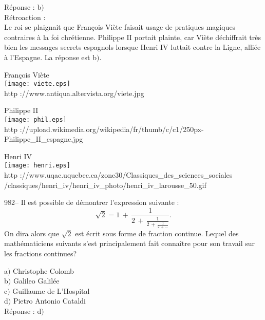 ﻿\documentclass[letterpaper, 12pt]{article}
\begin{document}
R\'eponse : b$)$\\

R\'etroaction : \\
Le roi se plaignait que Fran\c cois Vi\`ete faisait usage de
pratiques magiques contraires \`a la foi chr\'etienne. Philippe II
portait plainte, car Vi\`ete d\'echiffrait tr\`es bien les messages
secrets espagnols lorsque Henri IV luttait contre la Ligne, alli\'ee
\`a l'Espagne.
La r\'eponse est b$)$.\\

        \begin{center}
        Fran\c cois Vi\`ete\\
    \texttt{[image: viete.eps]}\\
        {\footnotesize http ://www.antiqua.altervista.org/viete.jpg}
    \end{center}

        \begin{center}
        Philippe II\\
    \texttt{[image: phil.eps]}\\
        {\footnotesize http
://upload.wikimedia.org/wikipedia/fr/thumb/c/c1/250px-Philippe\_II\_espagne.jpg}
    \end{center}

        \begin{center}
        Henri IV\\
    \texttt{[image: henri.eps]}\\
        {\footnotesize http
://www.uqac.uquebec.ca/zone30/Classiques\_des\_sciences\_sociales\\
        /classiques/henri\_iv/henri\_iv\_photo/henri\_iv\_larousse\_50.gif}
    \end{center}

982-- Il est possible de d\'emontrer l'expression suivante :
$$\sqrt2=1\,+\,\frac1{2\,+\,\frac1{2\,+\,\frac1{2\,+\,\ldots}}}.$$
On dira alors que $\sqrt2$ est \'ecrit sous forme de fraction
continue. Lequel des math\'ematiciens suivants s'est principalement
fait conna\^itre pour son travail sur les fractions continues?

a$)$ Christophe Colomb \\
b$)$ Galileo Galil\'ee \\
c$)$ Guillaume de L'Hospital \\
d$)$ Pietro Antonio Cataldi\\

R\'eponse : d$)$\\
\end{document}
